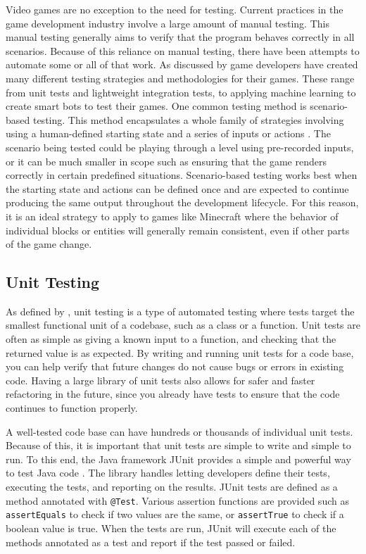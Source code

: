 \documentclass[12pt]{article}
\def\code#1{\texttt{#1}}
\begin{document}
\begin{onehalfspacing}
Video games are no exception to the need for testing. Current practices
in the game development industry involve a large amount of manual
testing. This manual testing generally aims to verify that the program
behaves correctly in all scenarios. Because of this reliance on manual
testing, there have been attempts to automate some or all of that work.
As discussed by \textcite{politowski2021survey} game developers have created
many different testing strategies and methodologies for their games.
These range from unit tests and lightweight integration tests, to
applying machine learning to create smart bots to test their games. One
common testing method is scenario-based testing. This method
encapsulates a whole family of strategies involving using a
human-defined starting state and a series of inputs or actions
\parencite{albaghajati2020video}. 
The scenario being tested could be playing
through a level using pre-recorded inputs, or it can be much smaller in
scope such as ensuring that the game renders correctly in certain
predefined situations. Scenario-based testing works best when the
starting state and actions can be defined once and are expected to
continue producing the same output throughout the development lifecycle.
For this reason, it is an ideal strategy to apply to games like
Minecraft where the behavior of individual blocks or entities will
generally remain consistent, even if other parts of the game change.

\subsection{Unit Testing}

As defined by \textcite{Huizinga2007}, unit testing is a type of automated
testing where tests target the smallest functional unit of a codebase,
such as a class or a function. Unit tests are often as simple as giving
a known input to a function, and checking that the returned value is as
expected. By writing and running unit tests for a code base, you can
help verify that future changes do not cause bugs or errors in existing
code. Having a large library of unit tests also allows for safer and
faster refactoring in the future, since you already have tests to ensure
that the code continues to function properly.

A well-tested code base can have hundreds or thousands of individual
unit tests. Because of this, it is important that unit tests are simple
to write and simple to run. To this end, the Java framework JUnit
provides a simple and powerful way to test Java code \parencite{rakshith2020comprehensive}. 
The library handles letting developers define their
tests, executing the tests, and reporting on the results. JUnit tests
are defined as a method annotated with \code{@Test}. Various assertion
functions are provided such as \code{assertEquals} to check if two values are
the same, or \code{assertTrue} to check if a boolean value is true. When the
tests are run, JUnit will execute each of the methods annotated as a
test and report if the test passed or failed.


\end{onehalfspacing}
\end{document}
